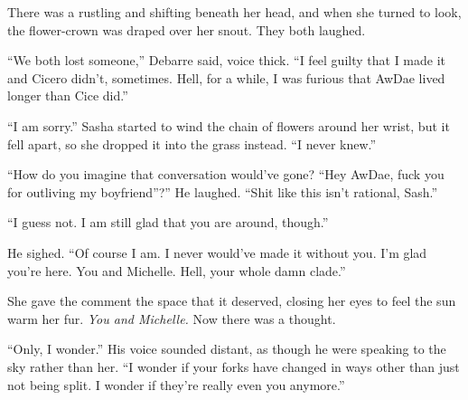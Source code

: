 There was a rustling and shifting beneath her head, and when she turned to look, the flower-crown was draped over her snout. They both laughed.

``We both lost someone,'' Debarre said, voice thick. ``I feel guilty that I made it and Cicero didn't, sometimes. Hell, for a while, I was furious that AwDae lived longer than Cice did.''

``I am sorry.'' Sasha started to wind the chain of flowers around her wrist, but it fell apart, so she dropped it into the grass instead. ``I never knew.''

``How do you imagine that conversation would've gone? ``Hey AwDae, fuck you for outliving my boyfriend''?'' He laughed. ``Shit like this isn't rational, Sash.''

``I guess not. I am still glad that you are around, though.''

He sighed. ``Of course I am. I never would've made it without you. I'm glad you're here. You and Michelle. Hell, your whole damn clade.''

She gave the comment the space that it deserved, closing her eyes to feel the sun warm her fur. \emph{You and Michelle.} Now there was a thought.

``Only, I wonder.'' His voice sounded distant, as though he were speaking to the sky rather than her. ``I wonder if your forks have changed in ways other than just not being split. I wonder if they're really even you anymore.''

